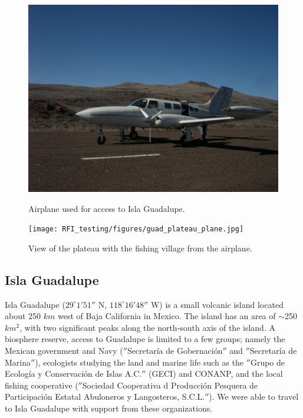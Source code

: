 \begin{figure}[tb]
\centering
\begin{minipage}[b]{0.45\textwidth}
\centering
\includegraphics[width=0.95\linewidth]{RFI_testing/figures/guad_plane.jpg}
\caption{Airplane used for access to Isla Guadalupe.}
\label{Fig:guadplane}
\end{minipage}%
\begin{minipage}[b]{0.02\textwidth}
\hspace{1cm}
\end{minipage}%
\begin{minipage}[b]{0.49\textwidth}
\centering
\texttt{[image: RFI\_testing/figures/guad\_plateau\_plane.jpg]}
\caption{View of the plateau with the fishing village from the airplane.}
\label{Fig:guadplateau}
\end{minipage}
\end{figure}

\subsection{Isla Guadalupe}

Isla Guadalupe ($29^\circ 1' 51''$ N, $118^\circ 16' 48''$ W) is a small volcanic island located about 250 $km$ west of Baja California in Mexico. The island has an area of $\sim$250 $km^2$, with two significant peaks along the north-south axis of the island. A biosphere reserve, access to Guadalupe is limited to a few groups; namely the Mexican government and Navy ($''$Secretar\'{i}a de Gobernaci\'{o}n$''$ and $''$Secretar\'{i}a de Marina$''$), ecologists studying the land and marine life such as the $''$Grupo de Ecolog\'{i}a y Conservaci\'{o}n de Islas A.C.$''$ (GECI) and CONANP, and the local fishing cooperative ($''$Sociedad Cooperativa d Producci\'{o}n Pesquera de Participaci\'{o}n Estatal Abuloneros y Langosteros, S.C.L.$''$). We were able to travel to Isla Guadalupe with support from these organizations. 


